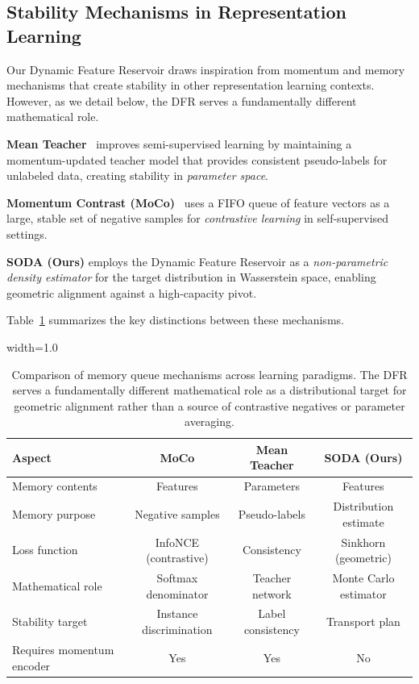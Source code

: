 \documentclass[preprint,12pt]{elsarticle}
\begin{document}
\subsection{Stability Mechanisms in Representation Learning}
\label{sec:stability_mechanisms}

Our Dynamic Feature Reservoir draws inspiration from momentum and memory mechanisms that create stability in other representation learning contexts. However, as we detail below, the DFR serves a fundamentally different mathematical role.

\textbf{Mean Teacher}~\citep{tarvainen2017mean} improves semi-supervised learning by maintaining a momentum-updated teacher model that provides consistent pseudo-labels for unlabeled data, creating stability in \textit{parameter space}.

\textbf{Momentum Contrast (MoCo)}~\citep{he2020momentum} uses a FIFO queue of feature vectors as a large, stable set of negative samples for \textit{contrastive learning} in self-supervised settings.
\begin{sloppypar} 
\textbf{SODA (Ours)} employs the Dynamic Feature Reservoir as a \textit{non-parametric density estimator} for the target distribution in Wasserstein space, enabling geometric alignment against a high-capacity pivot.
\end{sloppypar} 
Table~\ref{tab:queue_comparison} summarizes the key distinctions between these mechanisms.

\begin{table}[t]
\caption{Comparison of memory queue mechanisms across learning paradigms. The DFR serves a fundamentally different mathematical role as a distributional target for geometric alignment rather than a source of contrastive negatives or parameter averaging.}
\begin{adjustbox}{width=1.0\textwidth}

\label{tab:queue_comparison}
\centering
\small
\begin{tabular}{lccc}
\toprule
\textbf{Aspect} & \textbf{MoCo} & \textbf{Mean Teacher} & \textbf{SODA (Ours)} \\
\midrule
Memory contents & Features & Parameters & Features \\
Memory purpose & Negative samples & Pseudo-labels & Distribution estimate \\
Loss function & InfoNCE (contrastive) & Consistency & Sinkhorn (geometric) \\
Mathematical role & Softmax denominator & Teacher network & Monte Carlo estimator \\
Stability target & Instance discrimination & Label consistency & Transport plan \\
Requires momentum encoder & Yes & Yes & No \\
\bottomrule
\end{tabular}
\end{adjustbox}
\end{table}
\end{document}
